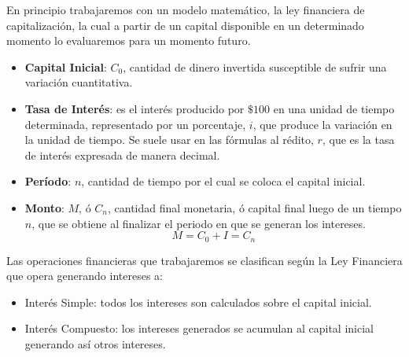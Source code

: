 \documentclass[12pt]{examdesign}
\theoremstyle{plain}
\theoremstyle{definition}
\theoremstyle{remark}
\begin{document}
\begin{endmatter}
    	En principio trabajaremos con un modelo matemático, la ley financiera de capitalización, la cual a partir de un capital disponible en un determinado momento lo evaluaremos para un momento futuro.
    	\begin{tcolorbox}[colback=red!10!white, colframe=tealgreen, title=\textbf{Los principales conceptos a trabajar serán son los siguientes:}]
    		\begin{itemize}
    			\item \textbf{Capital Inicial}: $C_{0}$, cantidad de dinero invertida susceptible de sufrir una variación cuantitativa.
    			\item \textbf{Tasa de Interés}: es el interés producido por $\$100$ en una unidad de tiempo determinada, representado por un porcentaje, $i$, que produce la variación en la unidad de tiempo. Se suele usar en las fórmulas al rédito, $r$, que es la tasa de interés expresada de manera decimal.
    			\item \textbf{Período}: $n$, cantidad de tiempo por el cual se coloca el capital inicial.
    			\item \textbf{Monto}: $M$, ó $C_{n}$, cantidad final monetaria, ó capital final luego de un tiempo $n$, que se obtiene al finalizar el periodo en que se generan los intereses.
    			\begin{equation}
    			    M = C_{0} + I = C_{n}
    			\end{equation}
    		\end{itemize}
    	\end{tcolorbox}
    	\vspace{.2cm}
    	
    	Las operaciones financieras que trabajaremos se clasifican según la Ley Financiera que opera generando intereses a:
    	
    	\begin{itemize}
    		\item Interés Simple: todos los intereses son calculados sobre el capital inicial.
    		\item Interés Compuesto: los intereses generados se acumulan al capital inicial generando así otros intereses.
    	\end{itemize}
    	

\end{endmatter}
\end{document}
